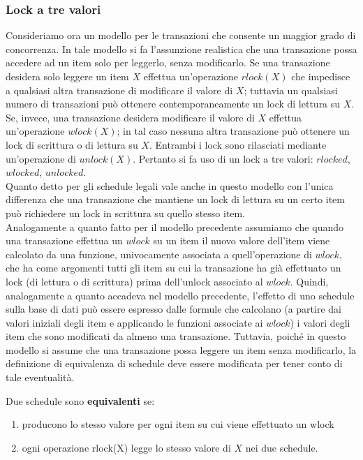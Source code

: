\subsubsection{Lock a tre valori}
Consideriamo ora un modello per le transazioni che consente un maggior grado di concorrenza. In
tale modello si fa l'assunzione realistica che una transazione possa accedere ad un item solo per
leggerlo, senza modificarlo. Se una transazione desidera solo leggere un item $X$ effettua
un'operazione $rlock(X)$ che impedisce a qualsiasi altra transazione di modificare il valore di $X$;
tuttavia un qualsiasi numero di transazioni può ottenere contemporaneamente un lock di lettura su
$X$. Se, invece, una transazione desidera modificare il valore di $X$ effettua un'operazione $wlock(X)$; in
tal caso nessuna altra transazione può ottenere un lock di scrittura o di lettura su $X$. Entrambi i lock
sono rilasciati mediante un'operazione di $unlock(X)$. Pertanto si fa uso di un lock a tre valori:
$rlocked$, $wlocked$, $unlocked$.\\
Quanto detto per gli schedule legali vale anche in questo modello con l'unica differenza che una
transazione che mantiene un lock di lettura su un certo item può richiedere un lock in scrittura su
quello stesso item.\\
Analogamente a quanto fatto per il modello precedente assumiamo che quando una transazione
effettua un $wlock$ su un item il nuovo valore dell'item viene calcolato da una funzione,
univocamente associata a quell'operazione di $wlock$, che ha come argomenti tutti gli item su cui la
transazione ha già effettuato un lock (di lettura o di scrittura) prima dell'unlock associato al $wlock$.
Quindi, analogamente a quanto accadeva nel modello precedente, l'effetto di uno schedule sulla
base di dati può essere espresso dalle formule che calcolano (a partire dai valori iniziali degli item e
applicando le funzioni associate ai $wlock$) i valori degli item che sono modificati da almeno una
transazione. Tuttavia, poiché in questo modello si assume che una transazione possa leggere un item
senza modificarlo, la definizione di equivalenza di schedule deve essere modificata per tener conto
di tale eventualità.\\
\begin{defn}
 Due schedule sono \textbf{equivalenti} se:
 \begin{enumerate}
  \item producono lo stesso valore per ogni item su cui viene effettuato un wlock
  \item ogni operazione rlock(X) legge lo stesso valore di $X$ nei due schedule.
 \end{enumerate}
\end{defn}


